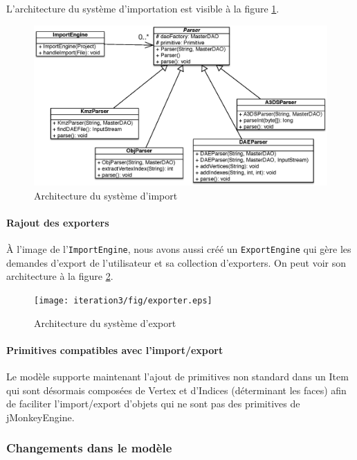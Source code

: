 		L'architecture du système d'importation est visible à la figure \ref{fig:model:parsersarchi}.

		\begin{figure}
			\center
			\includegraphics[width=\textwidth]{iteration3/fig/ParsersArchi.eps}
			\caption{\label{fig:model:parsersarchi} Architecture du système d'import}
		\end{figure}

		\paragraph{Rajout des exporters}
		À l'image de l'\texttt{ImportEngine}, nous avons aussi créé un 
		\texttt{ExportEngine} qui gère les demandes d'export de l'utilisateur et
		sa collection d'exporters. On peut voir son architecture à la figure
		\ref{fig:model:exportarchi}.

		\begin{figure}
			\center
			\texttt{[image: iteration3/fig/exporter.eps]}
			\caption{\label{fig:model:exportarchi} Architecture du système d'export}
		\end{figure}

		\paragraph{Primitives compatibles avec l'import/export}
		Le modèle supporte maintenant l'ajout de primitives non standard dans un
		Item qui sont désormais composées de Vertex et d'Indices (déterminant 
		les faces) afin de faciliter l'import/export d'objets qui ne sont pas des
		primitives de jMonkeyEngine.

	\subsubsection{Changements dans le modèle}

